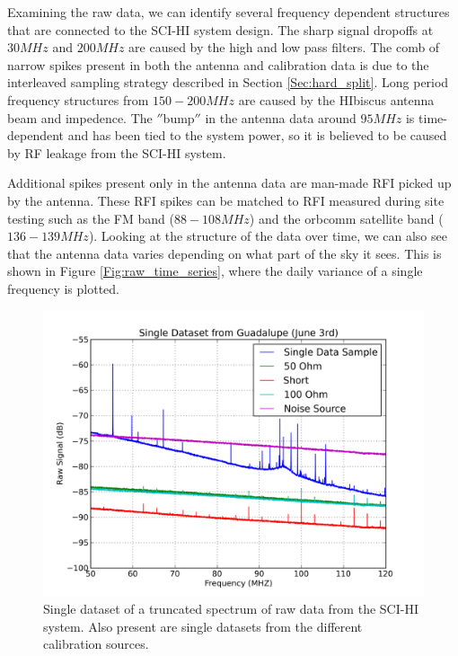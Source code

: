 Examining the raw data, we can identify several frequency dependent structures that are connected to the SCI-HI system design. The sharp signal dropoffs at $30 MHz$ and $200 MHz$ are caused by the high and low pass filters. The comb of narrow spikes present in both the antenna and calibration data is due to the interleaved sampling strategy described in Section \ref{Sec:hard_split}. Long period frequency structures from $150-200 MHz$ are caused by the HIbiscus antenna beam and impedence. The $''$bump$''$ in the antenna data around $95 MHz$ is time-dependent and has been tied to the system power, so it is believed to be caused by RF leakage from the SCI-HI system. 

Additional spikes present only in the antenna data are man-made RFI picked up by the antenna. These RFI spikes can be matched to RFI measured during site testing such as the FM band ($88-108 MHz$) and the orbcomm satellite band ($136-139 MHz$). Looking at the structure of the data over time, we can also see that the antenna data varies depending on what part of the sky it sees. This is shown in Figure \ref{Fig:raw_time_series}, where the daily variance of a single frequency is plotted.  


\begin{figure}[htb]
\begin{center}
\includegraphics[width=0.9\linewidth]{Data_analysis/figures/single_raw_trunc_guad_june03.png}
\caption{Single dataset of a truncated spectrum of raw data from the SCI-HI system. Also present are single datasets from the different calibration sources.}
\label{Fig:raw_data_trunc}
\end{center}
\end{figure}


